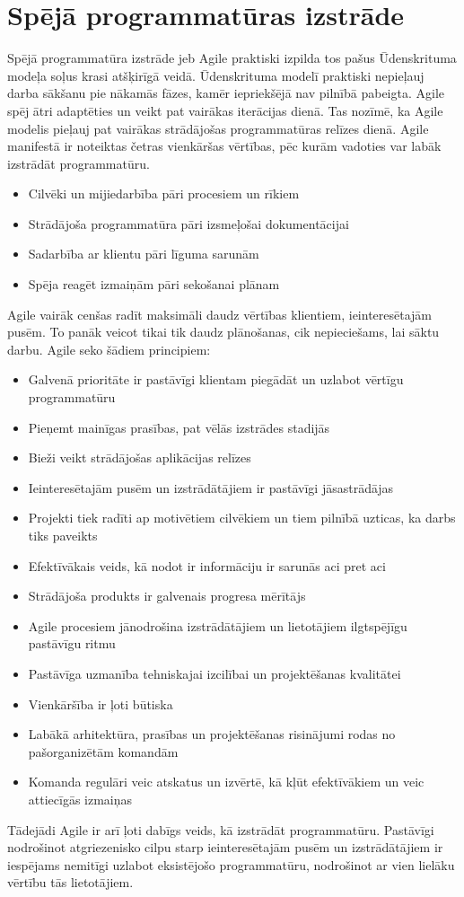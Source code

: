 \section{Spējā programmatūras izstrāde}
Spējā programmatūra izstrāde jeb Agile  praktiski izpilda tos pašus Ūdenskrituma modeļa soļus krasi atšķirīgā veidā. Ūdenskrituma modelī praktiski nepieļauj darba sākšanu pie nākamās fāzes, kamēr iepriekšējā nav pilnībā pabeigta. Agile spēj ātri adaptēties un veikt pat vairākas iterācijas dienā. Tas nozīmē, ka Agile modelis pieļauj pat vairākas strādājošas programmatūras relīzes dienā.
Agile manifestā ir noteiktas četras vienkāršas vērtības, pēc kurām vadoties var labāk izstrādāt programmatūru.
\begin{itemize}
	\item Cilvēki un mijiedarbība pāri procesiem un rīkiem
	\item Strādājoša programmatūra pāri izsmeļošai dokumentācijai
	\item Sadarbība ar klientu pāri līguma sarunām
	\item Spēja reagēt izmaiņām pāri sekošanai plānam
\end{itemize}
Agile vairāk cenšas radīt maksimāli daudz vērtības klientiem, ieinteresētajām pusēm. To panāk veicot tikai tik daudz plānošanas, cik nepieciešams, lai sāktu darbu.
Agile seko šādiem principiem:
\begin{itemize}
	\item Galvenā prioritāte ir pastāvīgi klientam piegādāt un uzlabot vērtīgu programmatūru
	\item Pieņemt mainīgas prasības, pat vēlās izstrādes stadijās
	\item Bieži veikt strādājošas aplikācijas relīzes
	\item Ieinteresētajām pusēm un izstrādātājiem ir pastāvīgi jāsastrādājas
	\item Projekti tiek radīti ap motivētiem cilvēkiem un tiem pilnībā uzticas, ka darbs tiks paveikts
	\item Efektīvākais veids, kā nodot ir informāciju ir sarunās aci pret aci
	\item Strādājoša produkts ir galvenais progresa mērītājs
	\item Agile procesiem jānodrošina izstrādātājiem un lietotājiem ilgtspējīgu pastāvīgu ritmu
	\item Pastāvīga uzmanība tehniskajai izcilībai un projektēšanas kvalitātei
	\item Vienkāršība ir ļoti būtiska
	\item Labākā arhitektūra, prasības un projektēšanas risinājumi rodas no pašorganizētām komandām
	\item Komanda regulāri veic atskatus un izvērtē, kā kļūt efektīvākiem un veic attiecīgās izmaiņas
\end{itemize}
Tādejādi Agile ir arī ļoti dabīgs veids, kā izstrādāt programmatūru. Pastāvīgi nodrošinot atgriezenisko cilpu starp ieinteresētajām pusēm un izstrādātājiem ir iespējams nemitīgi uzlabot eksistējošo programmatūru, nodrošinot ar vien lielāku vērtību tās lietotājiem.
\cite{agile-man}

